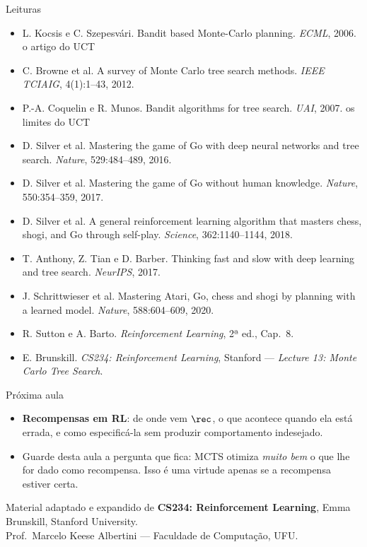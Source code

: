 \documentclass[aspectratio=169, 11pt]{beamer}
\begin{document}
\begin{frame}{Leituras}
  {\small
  \begin{itemize}\setlength{\itemsep}{0.25ex}
    \item L. Kocsis e C. Szepesvári. Bandit based Monte-Carlo planning.
          \emph{ECML}, 2006. \hfill \color{rlCinza}\scriptsize o artigo do UCT
    \item \color{black} C. Browne et al. A survey of Monte Carlo tree search
          methods. \emph{IEEE TCIAIG}, 4(1):1--43, 2012.
    \item P.-A. Coquelin e R. Munos. Bandit algorithms for tree search.
          \emph{UAI}, 2007. \hfill \color{rlCinza}\scriptsize os limites do UCT
    \item \color{black} D. Silver et al. Mastering the game of Go with deep
          neural networks and tree search. \emph{Nature}, 529:484--489, 2016.
    \item D. Silver et al. Mastering the game of Go without human knowledge.
          \emph{Nature}, 550:354--359, 2017.
    \item D. Silver et al. A general reinforcement learning algorithm that
          masters chess, shogi, and Go through self-play. \emph{Science},
          362:1140--1144, 2018.
    \item T. Anthony, Z. Tian e D. Barber. Thinking fast and slow with deep
          learning and tree search. \emph{NeurIPS}, 2017.
    \item J. Schrittwieser et al. Mastering Atari, Go, chess and shogi by
          planning with a learned model. \emph{Nature}, 588:604--609, 2020.
    \item R. Sutton e A. Barto. \emph{Reinforcement Learning}, 2ª ed., Cap.\ 8.
    \item E. Brunskill. \emph{CS234: Reinforcement Learning}, Stanford ---
          \emph{Lecture 13: Monte Carlo Tree Search}.
  \end{itemize}}
\end{frame}

\begin{frame}{Próxima aula}
  \begin{itemize}
    \item \textbf{Recompensas em RL}: de onde vem $\rec$, o que acontece quando
          ela está errada, e como especificá-la sem produzir comportamento
          indesejado.
    \item Guarde desta aula a pergunta que fica: MCTS otimiza \emph{muito bem}
          o que lhe for dado como recompensa. Isso é uma virtude apenas se a
          recompensa estiver certa.
  \end{itemize}

  \vfill
  \centering
  {\color{rlCinza}\small Material adaptado e expandido de \textbf{CS234:
  Reinforcement Learning}, Emma Brunskill, Stanford University.\\
  Prof.\ Marcelo Keese Albertini --- Faculdade de Computação, UFU.}
\end{frame}
\end{document}
